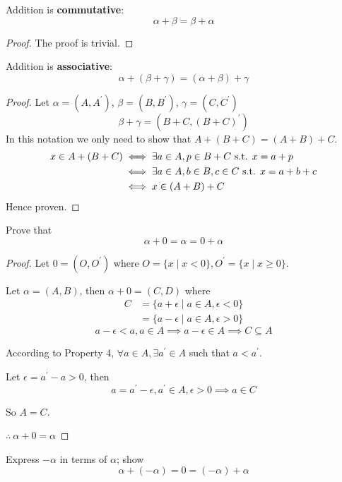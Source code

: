 \begin{property}[Commutativity]
Addition is \textbf{commutative}:
\[ \alpha + \beta = \beta + \alpha \]
\end{property}

\begin{proof}
The proof is trivial.
\end{proof}

\begin{property}[Associativity]
Addition is \textbf{associative}:
\[ \alpha + (\beta + \gamma)=(\alpha + \beta)+ \gamma \]
\end{property}

\begin{proof}
Let $\alpha = (A,A^\prime)$, $\beta = (B,B^\prime)$, $\gamma = (C,C^\prime)$
\[ \beta + \gamma = (B+C, (B+C)^\prime) \]
In this notation we only need to show that $A+(B+C)=(A+B)+C$.
\begin{align*}
x \in A+(B+C) 
&\iff \exists a \in A, p \in B+C \text{ s.t. } x=a+p \\
&\iff \exists a \in A, b \in B, c \in C \text{ s.t. } x=a+b+c \\
&\iff x \in (A+B)+C
\end{align*}
Hence proven.
\end{proof}

\begin{exmp}{}{}
Prove that
\[ \alpha+0 = \alpha = 0+\alpha \]
\end{exmp}

\begin{proof}
Let $0=(O,O^\prime)$ where $O=\{x \mid x<0\}, O^\prime=\{x \mid x\ge0\}$.

Let $\alpha=(A,B)$, then $\alpha+0=(C,D)$ where
\begin{align*}
C&=\{a + \epsilon  \mid  a \in A, \epsilon<0\} \\
&=\{a - \epsilon  \mid  a \in A, \epsilon>0\}
\end{align*}
\[ a - \epsilon < a, a \in A \implies a - \epsilon \in A \implies C \subseteq A \]

According to Property 4, $\forall a \in A, \exists a^\prime \in A$ such that $a < a^\prime$.

Let $\epsilon = a^\prime - a > 0$, then 
\[ a = a^\prime - \epsilon, a^\prime \in A, \epsilon>0 \implies a \in C \]

So $A=C$.

$\therefore\:\alpha+0=\alpha$
\end{proof}

\begin{exmp}{}{}
Express $-\alpha$ in terms of $\alpha$; show
\[ \alpha+(-\alpha)=0=(-\alpha)+\alpha \]
\end{exmp}


